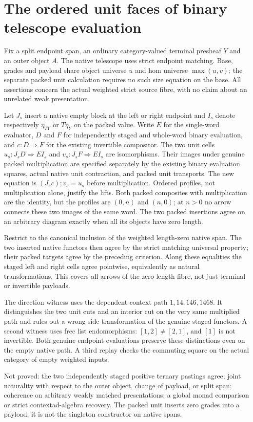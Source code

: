 \documentclass{article}
\begin{document}
\section*{The ordered unit faces of binary telescope evaluation}
Fix a split endpoint span, an ordinary category-valued terminal presheaf $Y$ and an outer object $A$. The native telescope uses strict endpoint matching. Base, grades and payload share object universe $u$ and hom universe $\max(u,v)$; the separate packed unit calculation requires no such size equation on the base. All assertions concern the actual weighted strict source fibre, with no claim about an unrelated weak presentation.
\par Let $J_s$ insert a native empty block at the left or right endpoint and $I_s$ denote respectively $\eta_{TY}$ or $T\eta_Y$ on the packed value. Write $E$ for the single-word evaluator, $D$ and $F$ for independently staged and whole-word binary evaluation, and $c:D\Rightarrow F$ for the existing invertible compositor. The two unit cells $u_s:J_sD\Rightarrow EI_s$ and $v_s:J_sF\Rightarrow EI_s$ are isomorphisms. Their images under genuine packed multiplication are specified separately by the existing binary evaluation squares, actual native unit contraction, and packed unit transports. The new equation is $(J_sc);v_s=u_s$ before multiplication. Ordered profiles, not multiplication alone, justify the lifts. Both packed composites with multiplication are the identity, but the profiles are $(0,n)$ and $(n,0)$; at $n>0$ no arrow connects these two images of the same word. The two packed insertions agree on an arbitrary diagram exactly when all its objects have zero length.
\par Restrict to the canonical inclusion of the weighted length-zero native span. The two inserted native functors then agree by the strict matching universal property; their packed targets agree by the preceding criterion. Along these equalities the staged left and right cells agree pointwise, equivalently as natural transformations. This covers all arrows of the zero-length fibre, not just terminal or invertible payloads.
\par The direction witness uses the dependent context path $1,14,146,1468$. It distinguishes the two unit cuts and an interior cut on the very same multiplied path and rules out a wrong-side transformation of the genuine staged functors. A second witness uses free list endomorphisms: $[1,2]\ne[2,1]$, and $[1]$ is not invertible. Both genuine endpoint evaluations preserve these distinctions even on the empty native path. A third replay checks the commuting square on the actual category of empty weighted inputs.
\par Not proved: the two independently staged positive ternary pastings agree; joint naturality with respect to the outer object, change of payload, or split span; coherence on arbitrary weakly matched presentations; a global monad comparison or strict contextad-algebra recovery. The packed unit inserts zero grades into a payload; it is not the singleton constructor on native spans.
\end{document}
